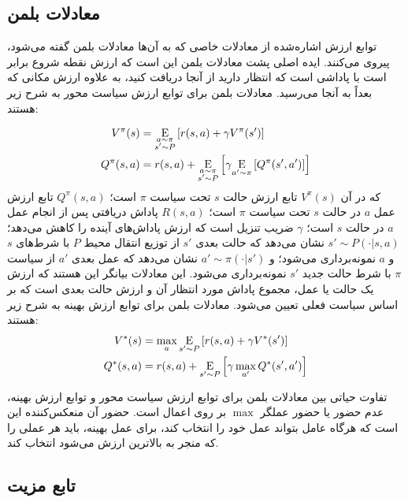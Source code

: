   \subsection{ معادلات بلمن}
   
   توابع ارزش اشاره‌شده از معادلات خاصی که به آن‌ها معادلات بلمن گفته می‌شود، پیروی می‌کنند. ایده اصلی پشت معادلات بلمن این است که
   ارزش نقطه شروع برابر است با پاداشی است که انتظار دارید از آنجا دریافت کنید، به علاوه ارزش مکانی که بعداً به آنجا می‌رسید.
   معادلات بلمن برای توابع ارزش سیاست محور به شرح زیر هستند:
  
  \begin{align}
  	V^{\pi}(s) &=  \underset{\substack{a \sim \pi \\ s'\sim P}}{\mathrm{E}} 
  	\left[
  	{r(s,a) + \gamma V^{\pi}(s')}
  	\right] \\
  	  	Q^{\pi}(s,a) &=  r(s,a) +  \underset{\substack{a \sim \pi \\ s'\sim P}}{\mathrm{E}} 
  	  	\left[
  	  	{ \gamma \underset{a'\sim \pi}{\mathrm{E}}\left[
  	  		{Q^{\pi}(s',a')}
  	  		\right]
  	  	}
  	  	\right]
  \end{align}
  که در آن \( V^\pi(s) \) تابع ارزش حالت \( s \) تحت سیاست \( \pi \) است؛ \( Q^\pi(s,a) \) تابع ارزش عمل \( a \) در حالت \( s \) تحت سیاست \( \pi \) است؛ \( R(s,a) \) پاداش دریافتی پس از انجام عمل \( a \) در حالت \( s \) است؛ \( \gamma \) ضریب تنزیل است که ارزش پاداش‌های آینده را کاهش می‌دهد؛ \( s' \sim P(\cdot|s,a) \) نشان می‌دهد که حالت بعدی \( s' \) از توزیع انتقال محیط \( P \) با شرط‌های \( s \) و \( a \) نمونه‌برداری می‌شود؛ و \( a' \sim \pi(\cdot|s') \) نشان می‌دهد که عمل بعدی \( a' \) از سیاست \( \pi \) با شرط حالت جدید \( s' \) نمونه‌برداری می‌شود.
  این معادلات بیانگر این هستند که ارزش یک حالت یا عمل، مجموع پاداش مورد انتظار آن و ارزش حالت بعدی است که بر اساس سیاست فعلی تعیین می‌شود.
  معادلات بلمن برای توابع ارزش بهینه به شرح زیر هستند:
\begin{align}
	V^*(s) &= \max_a \underset{s'\sim P}{\mathrm{E}}\left[
	{r(s,a) + \gamma V^*(s')}\right] \\
	Q^*(s,a) &= r(s,a) +  \underset{s'\sim P}{\mathrm{E}}\left[
	{\gamma \max_{a'} Q^*(s',a')}\right]
\end{align}
  
  تفاوت حیاتی بین معادلات بلمن برای توابع ارزش سیاست محور و توابع ارزش بهینه، عدم حضور یا حضور عملگر \(\max\) بر روی اعمال است. حضور آن منعکس‌کننده این است که هرگاه عامل بتواند عمل خود را انتخاب کند، برای عمل بهینه، باید هر عملی را که منجر به بالاترین ارزش می‌شود انتخاب کند.
  
  
  \subsection{تابع مزیت}
  
